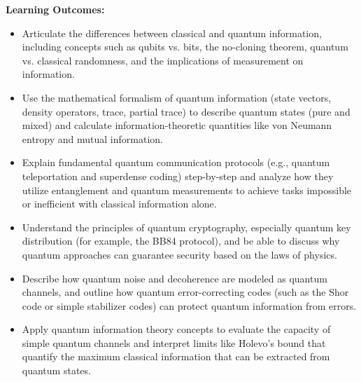 \documentclass{scrreprt}
\begin{document}
\textbf{Learning Outcomes:}
\begin{itemize}
\item Articulate the differences between classical and quantum information, including concepts such as qubits vs. bits, the no-cloning theorem, quantum vs. classical randomness, and the implications of measurement on information.
\item Use the mathematical formalism of quantum information (state vectors, density operators, trace, partial trace) to describe quantum states (pure and mixed) and calculate information-theoretic quantities like von Neumann entropy and mutual information.
\item Explain fundamental quantum communication protocols (e.g., quantum teleportation and superdense coding) step-by-step and analyze how they utilize entanglement and quantum measurements to achieve tasks impossible or inefficient with classical information alone.
\item Understand the principles of quantum cryptography, especially quantum key distribution (for example, the BB84 protocol), and be able to discuss why quantum approaches can guarantee security based on the laws of physics.
\item Describe how quantum noise and decoherence are modeled as quantum channels, and outline how quantum error-correcting codes (such as the Shor code or simple stabilizer codes) can protect quantum information from errors.
\item Apply quantum information theory concepts to evaluate the capacity of simple quantum channels and interpret limits like Holevo’s bound that quantify the maximum classical information that can be extracted from quantum states.
\end{itemize}
\begin{comment}
\textbf{Key Topics:}
\begin{itemize}
\item Quantum state representation and information: qubits vs. classical bits, bra-ket notation, density matrices for mixed states, quantum entropy.
\item Entanglement and non-local correlations: Bell states, EPR pairs, measures of entanglement, monogamy of entanglement.
\item Quantum information measures: von Neumann entropy, conditional entropy, mutual information, Holevo’s bound on accessible information.
\item Quantum communication protocols: quantum teleportation, superdense coding, entanglement swapping, quantum repeaters (conceptual introduction).
\item Quantum cryptography: quantum key distribution (BB84, Ekert protocol), no-cloning theorem and its implications for security, quantum random number generation.
\item Quantum error correction and quantum channels: noise models (bit-flip, phase-flip, depolarizing channel), simple quantum error-correcting codes, channel capacity concepts (classical capacity of a quantum channel, quantum capacity basics).
\end{itemize}
\end{comment}
\end{document}
